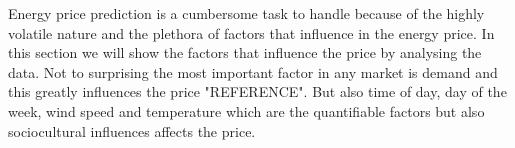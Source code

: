 Energy price prediction is a cumbersome task to handle because of the highly volatile nature and the plethora of factors that influence in the energy price. In this section we will show the factors that influence the price by analysing the data. Not to surprising the most important factor in any market is demand and this greatly influences the price "REFERENCE". But also time of day, day of the week, wind speed and temperature which are the quantifiable factors but also sociocultural influences affects the price.